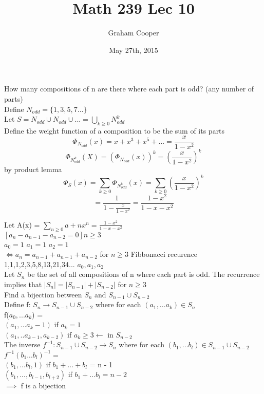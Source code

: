\documentclass[12pt]{article}
\title{\vspace{-15ex}Math 239 Lec 10\vspace{-1ex}}
\date{May 27th, 2015}
\author{Graham Cooper}
\begin{document}
	\maketitle
	
	How many compositions of n are there where each part is odd? (any number of parts)\\
	
	Define $N_{odd} = \{1,3,5,7...\}$\\
	Let $S = N_{odd} \cup N_{odd} \cup ... = \bigcup_{k \geq 0}N_{odd}^k$\\
	Define the weight function of a composition to be the sum of its parts\\
	
	$$\Phi_{N_{odd}}(x) = x + x^3 + x^5 + ... = \frac{x}{1-x^2}$$
	$$\Phi_{N_{odd}^k}(X) = (\Phi_{N_{odd}}(x))^k = (\frac{x}{1-x^2})^k$$
	 by product lemma
	$$\Phi_S(x) = \sum_{k \geq 0}\Phi_{N_{odd}^k}(x) = \sum_{k\geq 0}(\frac{x}{1-x^2})^k$$
	$$= \frac{1}{1-\frac{x}{1-x^2}} = \frac{1-x^2}{1-x-x^2}$$
	
	Let A(x) = $\sum_{n \geq 0}a+nx^n = \frac{1-x^2}{1-x-x^2}$\\
	$[a_n - a_{n-1} - a_{n-2} = 0] n \geq 3$\\
	$a_0 = 1$ $a_1 = 1$ $a_2 = 1$\\
	$\iff a_n = a_{n-1} + a_{n-1} + a_{n-2}$ for $n \geq 3$ Fibbonacci recurence\\
	1,1,1,2,3,5,8,13,21,34...
	$a_0, a_1, a_2$\\
	Let $S_n$ be the set of all compositions of n where each part is odd. The recurrence implies that $|S_n| = |S_{n-1}| + |S_{n-2}|$ for $n \geq 3$\\
	Find a bijection between $S_n$ and $S_{n-1} \cup S_{n-2}$\\
	
	Define f: $S_n \rightarrow S_{n-1} \cup S_{n-2}$ where for each $(a_1,...a_k) \in S_n$\\
	f($a_0,...a_k$) = \\
	$(a_1, ... a_k-1)$ if $a_k = 1$\\
	$(a_1, .. a_{k-1}, a_{k-2})$ if $a_k \geq 3 \leftarrow $ in $S_{n-2}$\\
	The inverse $f^{-1}: S_{n-1} \cup S_{n-2} \rightarrow S_n$ where for each $(b_1, ... b_l) \in S_{n-1} \cup S_{n-2}$\\
	
	$f^{-1}(b_1...b_l)^{-1} =$\\
	$(b_1,...b_l, 1)$ if $b_1 + ... + b_l$ = n - 1\\
	$(b_1, ..., b_{l-1},b_{l + 2})$ if $b_1 + ... b_l = n - 2$\\
	$\implies$ f is a bijection\\
	
\end{document}

